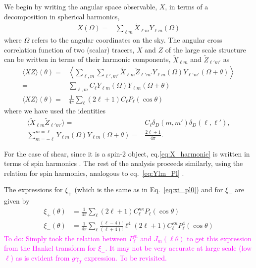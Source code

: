 \documentclass[\docopts]{\docclass}
\newcommand{\todo}[1]{\textcolor{magenta}{To do: #1}}
\begin{document}
We begin by writing the angular space observable, $X$, in terms of a decomposition in spherical harmonics, 
\begin{align}\label{eq:X_harmonic}
  X(\Omega)=&\sum_{\ell m}\tilde X_{\ell m}Y_{\ell m}(\Omega)
\end{align}
where $\Omega$ refers to the angular coordinates on the sky.
The angular cross correlation function of two (scalar) tracers, $X$ and $Z$ of the large scale structure can be written in terms of their harmonic components, $\tilde X_{\ell m}$ and $\tilde Z_{\ell' m'}$ as
\begin{align}
  \langle XZ \rangle(\theta)=&\left\langle\sum_{\ell,m}\sum_{\ell', m'}\tilde X_{\ell m}\tilde Z_{\ell' m'}
  Y_{\ell m}(\Omega)
  Y_{\ell'm'}(\Omega+\theta)\right\rangle\\
  =&\sum_{\ell,m}C_{\ell}Y_{\ell m}(\Omega)
  Y_{\ell m}(\Omega+\theta)\\
  \langle XZ \rangle(\theta)=&\frac{1}{4\pi}\sum_{\ell}(2\ell+1)C_{\ell}P_{\ell}(\cos\theta)\label{eq:xi_pl0}
\end{align}
where we have used the identities
\begin{align}
  \langle\tilde X_{\ell m}\tilde Z_{\ell' m'}\rangle=&C_{\ell}\delta_D(m,m')\delta_D(\ell,\ell'),\\
  \sum_{m=-\ell}^{m=\ell}Y_{\ell m}(\Omega)Y_{\ell m}(\Omega+\theta)=&\frac{2\ell+1}{4\pi}\label{eq:Ylm_Pl}.
\end{align}

For the case of shear, since it is a spin-2 object, eq.\ref{eq:X_harmonic} is written in terms of spin harmonics 
\citep[see for ex.][]{Castro2005,Kilbinger2017}. The rest of the analysis proceeds similarly, using the relation for spin 
harmonics, analogous to eq.~\ref{eq:Ylm_Pl} \citep[see for ex. ][]{Hu1997}. 

The expressions for $\xi_+$ (which is the same as in Eq.~\ref{eq:xi_pl0}) and for $\xi_-$ are given by
\begin{align}
  \xi_+(\theta)&=\frac{1}{4\pi}\sum_{\ell}{(2\ell+1)}C_{\ell}^{\kappa\kappa}
  P_{\ell}(\cos\theta)\label{eq:xi_p}\\
  \xi_-(\theta)&=\frac{1}{4\pi}\sum_{\ell}\frac{(\ell-4)!}{(\ell+4)!}\ell^4{(2\ell+1)}C_{\ell}^{\kappa\kappa}
  P_{\ell}^4(\cos\theta)\label{eq:xi_m}
\end{align}
\todo{Simply took the relation between $P_\ell^m$ and $J_m(\ell \theta)$ to get this expression from the Hankel transform for $\xi_-$. It may not be very accurate at large scale (low $\ell$) as is evident from $g\gamma_T$ expression. To be revisited.}
\end{document}

